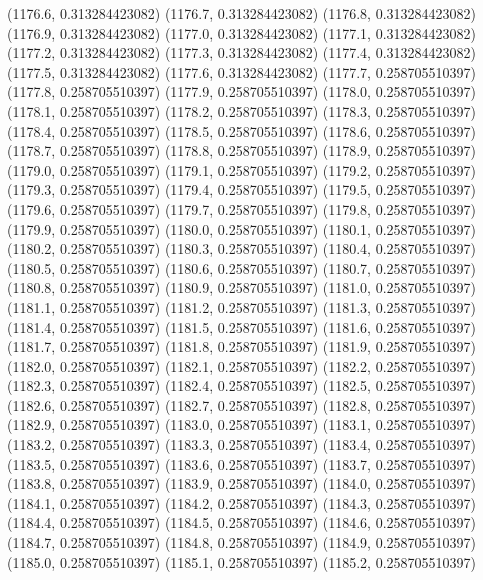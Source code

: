{					(1176.6, 0.313284423082)
					(1176.7, 0.313284423082)
					(1176.8, 0.313284423082)
					(1176.9, 0.313284423082)
					(1177.0, 0.313284423082)
					(1177.1, 0.313284423082)
					(1177.2, 0.313284423082)
					(1177.3, 0.313284423082)
					(1177.4, 0.313284423082)
					(1177.5, 0.313284423082)
					(1177.6, 0.313284423082)
					(1177.7, 0.258705510397)
					(1177.8, 0.258705510397)
					(1177.9, 0.258705510397)
					(1178.0, 0.258705510397)
					(1178.1, 0.258705510397)
					(1178.2, 0.258705510397)
					(1178.3, 0.258705510397)
					(1178.4, 0.258705510397)
					(1178.5, 0.258705510397)
					(1178.6, 0.258705510397)
					(1178.7, 0.258705510397)
					(1178.8, 0.258705510397)
					(1178.9, 0.258705510397)
					(1179.0, 0.258705510397)
					(1179.1, 0.258705510397)
					(1179.2, 0.258705510397)
					(1179.3, 0.258705510397)
					(1179.4, 0.258705510397)
					(1179.5, 0.258705510397)
					(1179.6, 0.258705510397)
					(1179.7, 0.258705510397)
					(1179.8, 0.258705510397)
					(1179.9, 0.258705510397)
					(1180.0, 0.258705510397)
					(1180.1, 0.258705510397)
					(1180.2, 0.258705510397)
					(1180.3, 0.258705510397)
					(1180.4, 0.258705510397)
					(1180.5, 0.258705510397)
					(1180.6, 0.258705510397)
					(1180.7, 0.258705510397)
					(1180.8, 0.258705510397)
					(1180.9, 0.258705510397)
					(1181.0, 0.258705510397)
					(1181.1, 0.258705510397)
					(1181.2, 0.258705510397)
					(1181.3, 0.258705510397)
					(1181.4, 0.258705510397)
					(1181.5, 0.258705510397)
					(1181.6, 0.258705510397)
					(1181.7, 0.258705510397)
					(1181.8, 0.258705510397)
					(1181.9, 0.258705510397)
					(1182.0, 0.258705510397)
					(1182.1, 0.258705510397)
					(1182.2, 0.258705510397)
					(1182.3, 0.258705510397)
					(1182.4, 0.258705510397)
					(1182.5, 0.258705510397)
					(1182.6, 0.258705510397)
					(1182.7, 0.258705510397)
					(1182.8, 0.258705510397)
					(1182.9, 0.258705510397)
					(1183.0, 0.258705510397)
					(1183.1, 0.258705510397)
					(1183.2, 0.258705510397)
					(1183.3, 0.258705510397)
					(1183.4, 0.258705510397)
					(1183.5, 0.258705510397)
					(1183.6, 0.258705510397)
					(1183.7, 0.258705510397)
					(1183.8, 0.258705510397)
					(1183.9, 0.258705510397)
					(1184.0, 0.258705510397)
					(1184.1, 0.258705510397)
					(1184.2, 0.258705510397)
					(1184.3, 0.258705510397)
					(1184.4, 0.258705510397)
					(1184.5, 0.258705510397)
					(1184.6, 0.258705510397)
					(1184.7, 0.258705510397)
					(1184.8, 0.258705510397)
					(1184.9, 0.258705510397)
					(1185.0, 0.258705510397)
					(1185.1, 0.258705510397)
					(1185.2, 0.258705510397)
}
